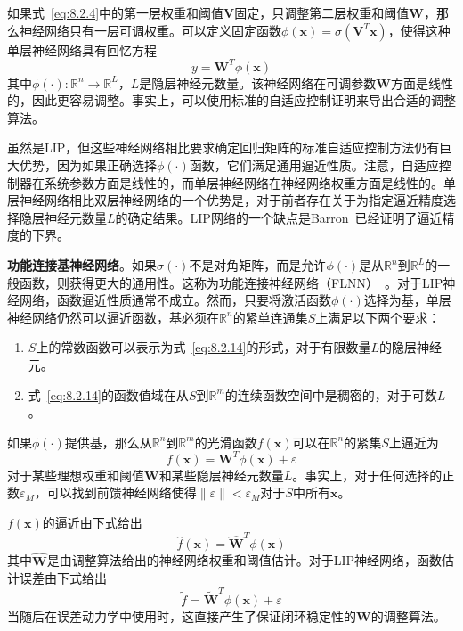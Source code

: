 \documentclass[12pt,a4paper]{ctexart}
\begin{document}
如果式~\eqref{eq:8.2.4}中的第一层权重和阈值$\bm{V}$固定，只调整第二层权重和阈值$\bm{W}$，那么神经网络只有一层可调权重。可以定义固定函数$\phi(\bm{x}) = \sigma(\bm{V}^T \bm{x})$，使得这种单层神经网络具有回忆方程
\begin{equation}\label{eq:8.2.14}
y = \bm{W}^T \phi(\bm{x})
\end{equation}
其中$\phi(\cdot): \mathbb{R}^n \to \mathbb{R}^L$，$L$是隐层神经元数量。该神经网络在可调参数$\bm{W}$方面是线性的，因此更容易调整。事实上，可以使用标准的自适应控制证明来导出合适的调整算法。

虽然是LIP，但这些神经网络相比要求确定回归矩阵的标准自适应控制方法仍有巨大优势，因为如果正确选择$\phi(\cdot)$函数，它们满足通用逼近性质。注意，自适应控制器在系统参数方面是线性的，而单层神经网络在神经网络权重方面是线性的。单层神经网络相比双层神经网络的一个优势是，对于前者存在关于为指定逼近精度选择隐层神经元数量$L$的确定结果。LIP网络的一个缺点是Barron~\cite{barron1993}已经证明了逼近精度的下界。

\textbf{功能连接基神经网络}。如果$\sigma(\cdot)$不是对角矩阵，而是允许$\phi(\cdot)$是从$\mathbb{R}^n$到$\mathbb{R}^L$的一般函数，则获得更大的通用性。这称为功能连接神经网络（FLNN）~\cite{sadegh1993}。对于LIP神经网络，函数逼近性质通常不成立。然而，只要将激活函数$\phi(\cdot)$选择为基，单层神经网络仍然可以逼近函数，基必须在$\mathbb{R}^n$的紧单连通集$S$上满足以下两个要求：

\begin{enumerate}
    \item $S$上的常数函数可以表示为式~\eqref{eq:8.2.14}的形式，对于有限数量$L$的隐层神经元。
    \item 式~\eqref{eq:8.2.14}的函数值域在从$S$到$\mathbb{R}^m$的连续函数空间中是稠密的，对于可数$L$。
\end{enumerate}

如果$\phi(\cdot)$提供基，那么从$\mathbb{R}^n$到$\mathbb{R}^m$的光滑函数$f(\bm{x})$可以在$\mathbb{R}^n$的紧集$S$上逼近为
\begin{equation}\label{eq:8.2.15}
f(\bm{x}) = \bm{W}^T \phi(\bm{x}) + \varepsilon
\end{equation}
对于某些理想权重和阈值$\bm{W}$和某些隐层神经元数量$L$。事实上，对于任何选择的正数$\varepsilon_M$，可以找到前馈神经网络使得$\|\varepsilon\| < \varepsilon_M$对于$S$中所有$\bm{x}$。

$f(\bm{x})$的逼近由下式给出
\begin{equation}\label{eq:8.2.16}
\hat{f}(\bm{x}) = \hat{\bm{W}}^T \phi(\bm{x})
\end{equation}
其中$\hat{\bm{W}}$是由调整算法给出的神经网络权重和阈值估计。对于LIP神经网络，函数估计误差由下式给出
\begin{equation}\label{eq:8.2.17}
\tilde{f} = \tilde{\bm{W}}^T \phi(\bm{x}) + \varepsilon
\end{equation}
当随后在误差动力学中使用时，这直接产生了保证闭环稳定性的$\bm{W}$的调整算法。
\end{document}
